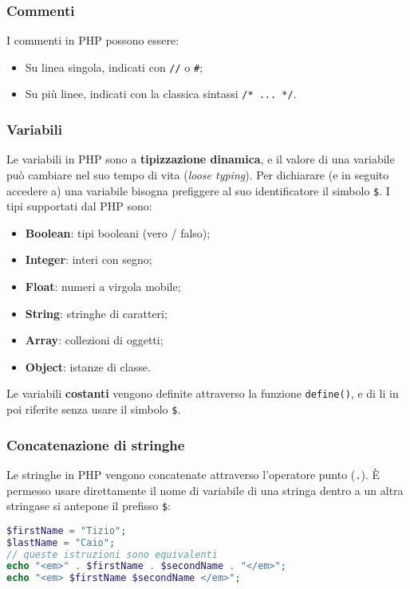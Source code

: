 \documentclass[a4paper,11pt]{article}
\begin{document}
\subsubsection{Commenti}
I commenti in PHP possono essere:
\begin{itemize}
	\item Su linea singola, indicati con \lstinline|//| o \lstinline|#|;
	\item Su più linee, indicati con la classica sintassi \lstinline|/* ... */|.
\end{itemize}

\subsubsection{Variabili}
Le variabili in PHP sono a \textbf{tipizzazione dinamica}, e il valore di una variabile può cambiare nel suo tempo di vita (\textit{loose typing}). 
Per dichiarare (e in seguito accedere a) una variabile bisogna prefiggere al suo identificatore il simbolo \lstinline|$|.
I tipi supportati dal PHP sono:
\begin{itemize}
	\item \textbf{Boolean}: tipi booleani (vero / falso);
	\item \textbf{Integer}: interi con segno;
	\item \textbf{Float}: numeri a virgola mobile;
	\item \textbf{String}: stringhe di caratteri;
	\item \textbf{Array}: collezioni di oggetti;
	\item \textbf{Object}: istanze di classe.
\end{itemize}

Le variabili \textbf{costanti} vengono definite attraverso la funzione \lstinline|define()|, e di li in poi riferite senza usare il simbolo \lstinline|$|.

\subsubsection{Concatenazione di stringhe}
Le stringhe in PHP vengono concatenate attraverso l'operatore punto (\lstinline|.|).
È permesso usare direttamente il nome di variabile di una stringa dentro a un altra stringase si antepone il prefisso \lstinline|$|:
\begin{lstlisting}[language=php, style=codestyle]	
$firstName = "Tizio";
$lastName = "Caio";
// queste istruzioni sono equivalenti
echo "<em>" . $firstName . $secondName . "</em>";
echo "<em> $firstName $secondName </em>";
\end{lstlisting}
\end{document}
